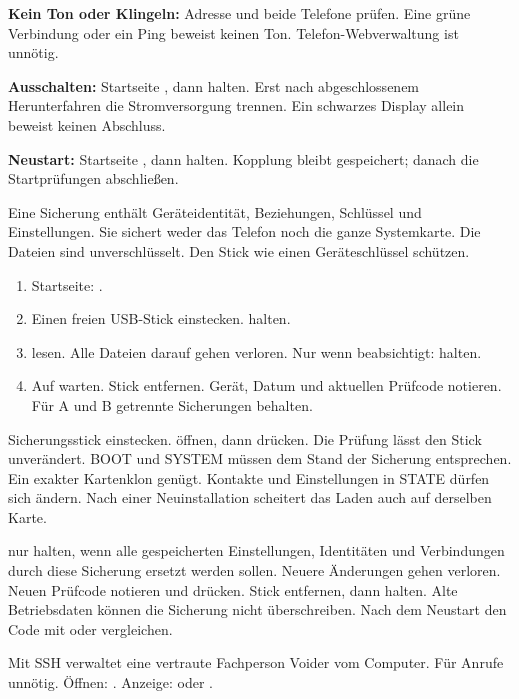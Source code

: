 \textbf{Kein Ton oder Klingeln:} Adresse und beide Telefone prüfen. Eine grüne Verbindung oder ein Ping beweist keinen Ton. Telefon-Webverwaltung ist unnötig.

\textbf{Ausschalten:} Startseite \arr {}, dann  halten. Erst nach abgeschlossenem Herunterfahren die Stromversorgung trennen. Ein schwarzes Display allein beweist keinen Abschluss.

\textbf{Neustart:} Startseite \arr {} \arr {}, dann  halten. Kopplung bleibt gespeichert; danach die Startprüfungen abschließen.

Eine Sicherung enthält Geräteidentität, Beziehungen, Schlüssel und Einstellungen. Sie sichert weder das Telefon noch die ganze Systemkarte. Die Dateien sind unverschlüsselt. Den Stick wie einen Geräteschlüssel schützen.
\begin{enumerate}
\item Startseite:  \arr {} \arr {}.
\item Einen freien USB-Stick einstecken.  halten.
\item {} lesen. Alle Dateien darauf gehen verloren. Nur wenn beabsichtigt:  halten.
\item Auf  warten. Stick entfernen. Gerät, Datum und aktuellen Prüfcode notieren. Für A und B getrennte Sicherungen behalten.
\end{enumerate}
Sicherungsstick einstecken.  \arr {} \arr {} \arr {} öffnen, dann  drücken. Die Prüfung lässt den Stick unverändert. BOOT und SYSTEM müssen dem Stand der Sicherung entsprechen. Ein exakter Kartenklon genügt. Kontakte und Einstellungen in STATE dürfen sich ändern. Nach einer Neuinstallation scheitert das Laden auch auf derselben Karte.

 nur halten, wenn alle gespeicherten Einstellungen, Identitäten und Verbindungen durch diese Sicherung ersetzt werden sollen. Neuere Änderungen gehen verloren. Neuen Prüfcode notieren und  drücken. Stick entfernen, dann  halten. Alte Betriebsdaten können die Sicherung nicht überschreiben. Nach dem Neustart den Code mit  oder  vergleichen.

Mit SSH verwaltet eine vertraute Fachperson Voider vom Computer. Für Anrufe unnötig. Öffnen:  \arr {} \arr {} \arr {}. Anzeige:  oder .

